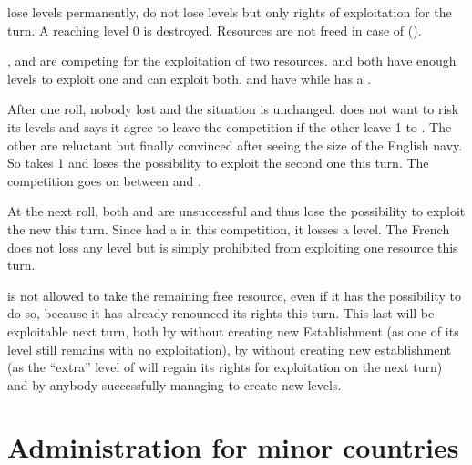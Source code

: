\bparag \TP lose levels permanently, \COL do not lose levels but only rights
of exploitation for the turn. A \TP reaching level 0 is destroyed.
\bparag Resources are not freed in case of 
().%

\begin{exemple}\HOL, \ENG and \FRA are competing for the exploitation of
  two  resources. \HOL and \FRA both have enough levels to exploit
  one and \ANG can exploit both. \ANG and \HOL have \TP while \FRA has a \COL.

  After one roll, nobody lost and the situation is unchanged. \ANG does not
  want to risk its levels and says it agree to leave the competition if the
  other leave 1  to \ANG. The other are reluctant but finally
  convinced after seeing the size of the English navy. So \ANG takes 1
   and loses the possibility to exploit the second one this
  turn. The competition goes on between \FRA and \HOL.

  At the next roll, both \ANG and \FRA are unsuccessful and thus lose the
  possibility to exploit the new  this turn. Since \HOL had a \TP
  in this competition, it losses a level. The French \COL does not loss any
  level but is simply prohibited from exploiting one resource this turn.

  \ANG is not allowed to take the remaining free resource, even if it has the
  possibility to do so, because it has already renounced its rights this
  turn. This last  will be exploitable next turn, both by \ANG
  without creating new Establishment (as one of its level still remains with
  no exploitation), by \FRA without creating new establishment (as the
  ``extra'' level of \COL will regain its rights for exploitation on the next
  turn) and by anybody successfully managing to create new levels.
\end{exemple}




\section{Administration for minor countries}

